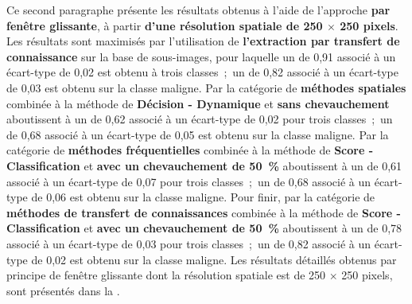 Ce second paragraphe présente les résultats obtenus à l'aide de l'approche \textbf{par fenêtre glissante}, à partir \textbf{d'une résolution spatiale de 250 $\times$ 250 pixels}. Les résultats sont maximisés par l'utilisation de \textbf{l'extraction par transfert de connaissance} sur la base de sous-images, pour laquelle un \fscore{} de 0,91 associé à un écart-type de 0,02 est obtenu à trois classes~;~un \fscore{} de 0,82 associé à un écart-type de 0,03 est obtenu sur la classe maligne. Par la catégorie de \textbf{méthodes spatiales} combinée à la méthode de \textbf{Décision - Dynamique} et \textbf{sans chevauchement} aboutissent à un \fscore{} de 0,62 associé à un écart-type de 0,02 pour trois classes~;~un \fscore{} de 0,68 associé à un écart-type de 0,05 est obtenu sur la classe maligne. Par la catégorie de \textbf{méthodes fréquentielles} combinée à la méthode de \textbf{Score - Classification} et \textbf{avec un chevauchement de 50~\%} aboutissent à un \fscore{} de 0,61 associé à un écart-type de 0,07 pour trois classes~;~un \fscore{} de 0,68 associé à un écart-type de 0,06 est obtenu sur la classe maligne. Pour finir, par la catégorie de \textbf{méthodes de transfert de connaissances} combinée à la méthode de \textbf{Score - Classification} et \textbf{avec un chevauchement de 50~\%} aboutissent à un \fscore{} de 0,78 associé à un écart-type de 0,03 pour trois classes~;~un \fscore{} de 0,82 associé à un écart-type de 0,02 est obtenu sur la classe maligne. Les résultats détaillés obtenus par principe de fenêtre glissante dont la résolution spatiale est de 250 $\times$ 250 pixels, sont présentés dans la .\par

